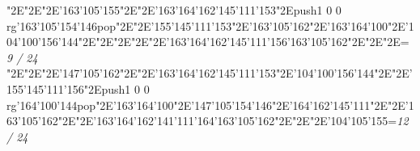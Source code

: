 \null\vfill\enskip\enskip\enskip\ipa\char"2E\enskip\enskip\enskip\ipa\char"2E\enskip\ipa\char"2E\enskip\enskip\enskip\bigskip\ipa\char'163\ipa\char'105\ipa\char'155\ipa\char"2E\enskip\enskip\enskip\ipa\char"2E\ipa\char'163\ipa\char'164\ipa\char'162\ipa\char'145\ipa\char'111\ipa\char'153\bigskip\enskip\enskip\ipa\char"2E\pdfcolorstack\match push{1 0 0 rg}\ipa\char'163\ipa\char'105\ipa\char'154\ipa\char'146\pdfcolorstack\match pop{}\ipa\char"2E\enskip\ipa\char"2E\ipa\char'155\ipa\char'145\ipa\char'111\ipa\char'153\ipa\char"2E\ipa\char'163\ipa\char'105\ipa\char'162\ipa\char"2E\ipa\char'163\ipa\char'164\ipa\char'100\ipa\char"2E\ipa\char'104\ipa\char'100\ipa\char'156\ipa\char'144\bigskip\enskip\ipa\char"2E\enskip\enskip\enskip\enskip\ipa\char"2E\enskip\enskip\ipa\char"2E\enskip\enskip\enskip\ipa\char"2E\enskip\enskip\ipa\char"2E\ipa\char'163\ipa\char'164\ipa\char'162\ipa\char'145\ipa\char'111\ipa\char'156\bigskip\ipa\char'163\ipa\char'105\ipa\char'162\ipa\char"2E\enskip\enskip\ipa\char"2E\enskip\enskip\enskip\ipa\char"2E\enskip\enskip\enskip\bigskip\vfill\footline={\hfill\tenrm\it 9 / 24}\eject
\null\vfill\enskip\enskip\enskip\ipa\char"2E\enskip\enskip\enskip\ipa\char"2E\enskip\ipa\char"2E\enskip\enskip\enskip\bigskip\ipa\char'147\ipa\char'105\ipa\char'162\ipa\char"2E\enskip\enskip\enskip\ipa\char"2E\ipa\char'163\ipa\char'164\ipa\char'162\ipa\char'145\ipa\char'111\ipa\char'153\bigskip\enskip\enskip\ipa\char"2E\ipa\char'104\ipa\char'100\ipa\char'156\ipa\char'144\ipa\char"2E\enskip\ipa\char"2E\ipa\char'155\ipa\char'145\ipa\char'111\ipa\char'156\ipa\char"2E\pdfcolorstack\match push{1 0 0 rg}\ipa\char'164\ipa\char'100\ipa\char'144\pdfcolorstack\match pop{}\ipa\char"2E\ipa\char'163\ipa\char'164\ipa\char'100\ipa\char"2E\ipa\char'147\ipa\char'105\ipa\char'154\ipa\char'146\bigskip\enskip\ipa\char"2E\ipa\char'164\ipa\char'162\ipa\char'145\ipa\char'111\ipa\char"2E\enskip\enskip\ipa\char"2E\ipa\char'163\ipa\char'105\ipa\char'162\ipa\char"2E\enskip\enskip\ipa\char"2E\ipa\char'163\ipa\char'164\ipa\char'162\ipa\char'141\ipa\char'111\ipa\char'164\bigskip\ipa\char'163\ipa\char'105\ipa\char'162\ipa\char"2E\enskip\enskip\ipa\char"2E\enskip\enskip\enskip\ipa\char"2E\ipa\char'104\ipa\char'105\ipa\char'155\bigskip\vfill\footline={\hfill\tenrm\it 12 / 24}\eject
